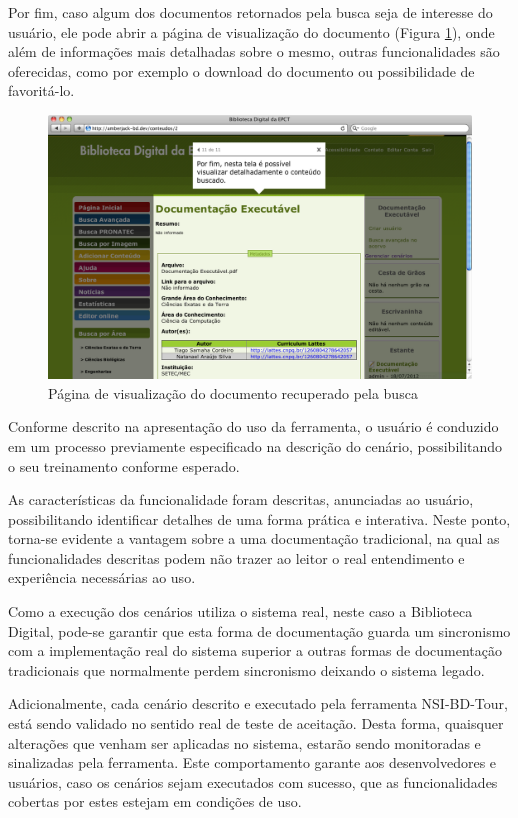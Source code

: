 \pagebreak

Por fim, caso algum dos documentos retornados pela busca seja de interesse do usuário, ele pode abrir a página de visualização do documento (Figura \ref{tour_7}), onde além de informações mais detalhadas sobre o mesmo, outras funcionalidades são oferecidas, como por exemplo o download do documento ou possibilidade de favoritá-lo.

\begin{figure}[ht]
    \centering
    \includegraphics[width=0.9 \textwidth]{figuras/tour_7}
    \caption{Página de visualização do documento recuperado pela busca}
    \label{tour_7}
\end{figure}

Conforme descrito na apresentação do uso da ferramenta, o usuário é conduzido em um processo previamente especificado na descrição do cenário, possibilitando o seu treinamento conforme esperado.

As características da funcionalidade foram descritas, anunciadas ao usuário, possibilitando identificar detalhes de uma forma prática e interativa. Neste ponto, torna-se evidente a vantagem sobre a uma documentação tradicional, na qual as funcionalidades descritas podem não trazer ao leitor o real entendimento e experiência necessárias ao uso.

Como a execução dos cenários utiliza o sistema real, neste caso a Biblioteca Digital, pode-se garantir que esta forma de documentação guarda um sincronismo com a implementação real do sistema superior a outras formas de documentação tradicionais que normalmente perdem sincronismo deixando o sistema legado.

Adicionalmente, cada cenário descrito e executado pela ferramenta NSI-BD-Tour, está sendo validado no sentido real de teste de aceitação. Desta forma, quaisquer alterações que venham ser aplicadas no sistema, estarão sendo monitoradas e sinalizadas pela ferramenta. Este comportamento garante aos desenvolvedores e usuários, caso os cenários sejam executados com sucesso, que as funcionalidades cobertas por estes estejam em condições de uso.